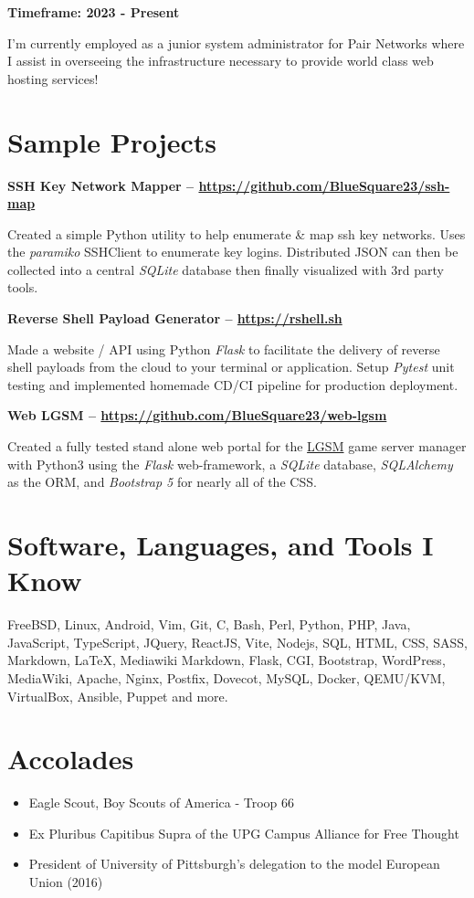 \documentclass{article}
\begin{document}
\noindent
\textbf{Timeframe: 2023 - Present}

I'm currently employed as a junior system administrator for Pair Networks where
I assist in overseeing the infrastructure necessary to provide world class web
hosting services!

\section{Sample Projects}

\noindent
\textbf{SSH Key Network Mapper -- \url{https://github.com/BlueSquare23/ssh-map}}

Created a simple Python utility to help enumerate \& map ssh key networks. Uses
the \emph{paramiko} SSHClient to enumerate key logins. Distributed JSON can then
be collected into a central \emph{SQLite} database then finally visualized
with 3rd party tools.

\noindent
\textbf{Reverse Shell Payload Generator -- \url{https://rshell.sh}}

Made a website / API using Python \emph{Flask} to facilitate the delivery of
reverse shell payloads from the cloud to your terminal or application. Setup
\emph{Pytest} unit testing and implemented homemade CD/CI pipeline for
production deployment.

\noindent
\textbf{Web LGSM -- \url{https://github.com/BlueSquare23/web-lgsm}}

Created a fully tested stand alone web portal for the
\href{https://linuxgsm.com/}{LGSM} game server manager with Python3 using the
\emph{Flask} web-framework, a \emph{SQLite} database, \emph{SQLAlchemy} as the
ORM, and \emph{Bootstrap 5} for nearly all of the CSS.

\section{Software, Languages, and Tools I Know}

FreeBSD, Linux, Android, Vim, Git, C, Bash, Perl, Python, PHP, Java,
JavaScript, TypeScript, JQuery, ReactJS, Vite, Nodejs, SQL, HTML, CSS, SASS,
Markdown, {\LaTeX}, Mediawiki Markdown, Flask, CGI, Bootstrap, WordPress,
MediaWiki, Apache, Nginx, Postfix, Dovecot, MySQL, Docker, QEMU/KVM,
VirtualBox, Ansible, Puppet and more. 

\section{Accolades}

\begin{itemize}
\setlength{\itemsep}{1pt}
\setlength{\parskip}{0pt}
\setlength{\parsep}{0pt}

\item Eagle Scout, Boy Scouts of America - Troop 66

\item Ex Pluribus Capitibus Supra of the UPG Campus Alliance for Free Thought

\item President of University of Pittsburgh's delegation to the model European Union (2016)
\end{itemize}
\end{document}
